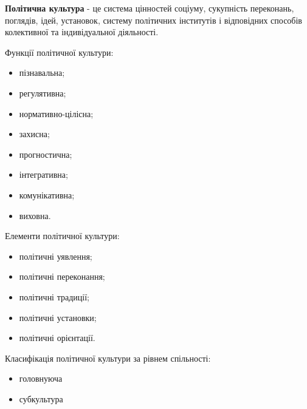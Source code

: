 \textbf{Політична культура} - це система цінностей соціуму, сукупність переконань, поглядів, ідей, установок, систему політичних інститутів і відповідних способів колективної та індивідуальної діяльності.

Функції політичної культури:
\begin{itemize}
\item пізнавальна;
\item регулятивна;
\item нормативно-цілісна;
\item захисна;
\item прогностична;
\item інтегративна;
\item комунікативна;
\item виховна.
\end{itemize}

Елементи політичної культури:
\begin{itemize}
\item політичні уявлення;
\item політичні переконання;
\item політичні традиції;
\item політичні установки;
\item політичні орієнтації.
\end{itemize}

Класифікація політичної культури за рівнем спільності:
\begin{itemize}
\item головнуюча
\item субкультура
\end{itemize}


